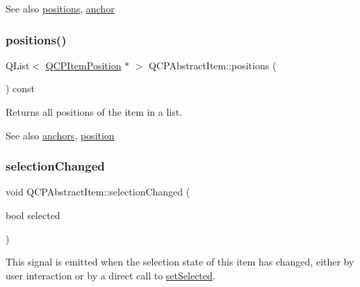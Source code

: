 \begin{DoxySeeAlso}{See also}
\mbox{\hyperlink{class_q_c_p_abstract_item_a709f655ac3f7f22d452714134662b454}{positions}}, \mbox{\hyperlink{class_q_c_p_abstract_item_a139c255ea8831642fac91748e29a5adb}{anchor}} 
\end{DoxySeeAlso}
\mbox{\label{class_q_c_p_abstract_item_a709f655ac3f7f22d452714134662b454}} 
\subsubsection{\texorpdfstring{positions()}{positions()}}
{\footnotesize\ttfamily Q\+List$<$ \mbox{\hyperlink{class_q_c_p_item_position}{Q\+C\+P\+Item\+Position}} $\ast$ $>$ Q\+C\+P\+Abstract\+Item\+::positions (\begin{DoxyParamCaption}{ }\end{DoxyParamCaption}) const\hspace{0.3cm}{\ttfamily [inline]}}

Returns all positions of the item in a list.

\begin{DoxySeeAlso}{See also}
\mbox{\hyperlink{class_q_c_p_abstract_item_a81d1ecfea3368b836cf9675a0045e659}{anchors}}, \mbox{\hyperlink{class_q_c_p_abstract_item_a2589c3d298f9a576d77d9addb440a18d}{position}} 
\end{DoxySeeAlso}
\mbox{\label{class_q_c_p_abstract_item_aa5cffb034fc65dbb91c77e02c1c14251}} 
\subsubsection{\texorpdfstring{selection\+Changed}{selectionChanged}}
{\footnotesize\ttfamily void Q\+C\+P\+Abstract\+Item\+::selection\+Changed (\begin{DoxyParamCaption}\item[{bool}]{selected }\end{DoxyParamCaption})\hspace{0.3cm}{\ttfamily [signal]}}

This signal is emitted when the selection state of this item has changed, either by user interaction or by a direct call to \mbox{\hyperlink{class_q_c_p_abstract_item_a203de94ad586cc44d16c9565f49d3378}{set\+Selected}}. \mbox{\label{class_q_c_p_abstract_item_a96d522d10ffc0413b9a366c6f7f0476b}} 
